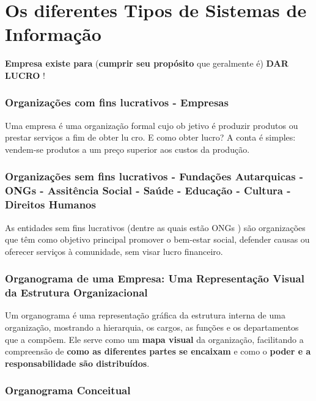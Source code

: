 \documentclass[
]{book}
\begin{document}
\section{Os diferentes Tipos de Sistemas de Informação}\label{os-diferentes-tipos-de-sistemas-de-informauxe7uxe3o}

\textbf{Empresa existe para} (\textbf{cumprir seu propósito} que geralmente é) \textbf{DAR LUCRO} !

\subsubsection{Organizações com fins lucrativos - Empresas}\label{organizauxe7uxf5es-com-fins-lucrativos---empresas}

Uma empresa é uma organização formal cujo ob­ jetivo é produzir produtos ou prestar serviços a fim de obter lu­ cro. E como obter lucro? A conta é simples: vendem-se produtos a um preço superior aos custos da produção.

\subsubsection{Organizações sem fins lucrativos - Fundações Autarquicas - ONGs - Assitência Social - Saúde - Educação - Cultura - Direitos Humanos}\label{organizauxe7uxf5es-sem-fins-lucrativos---fundauxe7uxf5es-autarquicas---ongs---assituxeancia-social---sauxfade---educauxe7uxe3o---cultura---direitos-humanos}

As entidades sem fins lucrativos (dentre as quais estão ONGs ) são organizações que têm como objetivo principal promover o bem-estar social, defender causas ou oferecer serviços à comunidade, sem visar lucro financeiro.

\subsubsection{Organograma de uma Empresa: Uma Representação Visual da Estrutura Organizacional}\label{organograma-de-uma-empresa-uma-representauxe7uxe3o-visual-da-estrutura-organizacional}

Um organograma é uma representação gráfica da estrutura interna de uma organização, mostrando a hierarquia, os cargos, as funções e os departamentos que a compõem. Ele serve como um \textbf{mapa visual} da organização, facilitando a compreensão de \textbf{como as diferentes partes se encaixam} e como o \textbf{poder e a responsabilidade são distribuídos}.

\subsubsection{Organograma Conceitual}\label{organograma-conceitual}
\end{document}
